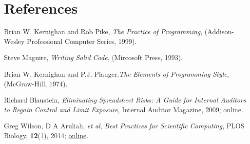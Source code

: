 \section{References}

\begingroup
\renewcommand{\section}[2]{}%

\begin{thebibliography}{99}
 Brian W. Kernighan and Rob Pike, \textit{The Practice of Programming}, (Addison-Wesley Professional Computer Series, 1999).

 Steve Maguire, \textit{Writing Solid Code}, (Mircosoft Press, 1993).
 
 Brian W. Kernighan and P.J. Plauger,\textit{The Elements of Programming Style}, (McGraw-Hill, 1974). 

 Richard Blaustein, \textit{Eliminating Spreadsheet Risks: A Guide for Internal Auditors to Regain Control and Limit Exposure}, Internal Auditor Magazine, 2009; \href{http://www.analyticsolutions.com/index_files/page0017.htm}{online}.

Greg Wilson, D A Aruliah, \textit{et al}, \textit{Best Practices for Scientific Computing}, PLOS Biology, \textbf{12}(1), 2014; \href{http://journals.plos.org/plosbiology/article?id=10.1371/journal.pbio.1001745}{online}.


\end{thebibliography}
\endgroup